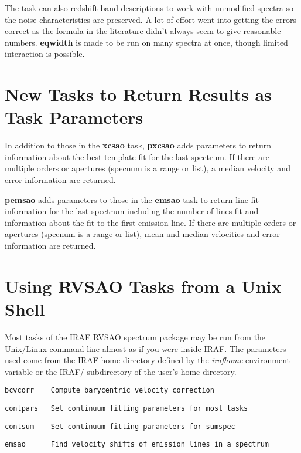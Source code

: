 The task can also redshift band descriptions to work with unmodified spectra so the noise characteristics are preserved.  A lot of effort went into getting the errors correct as the formula in the literature didn't always seem to give reasonable numbers.  \textbf{eqwidth} is made to be run on many spectra at once, though limited interaction is possible.

\section{New Tasks to Return Results as Task Parameters}

In addition to those in the \textbf{xcsao} task, \textbf{pxcsao} adds parameters to return information about the best template fit for the last spectrum.  If there are multiple orders or apertures (specnum is a  range or list), a median velocity and error information are returned.

\textbf{pemsao} adds parameters to those in the \textbf{emsao} task to return line fit information for the last spectrum including the number of lines fit and information about the fit to the first emission line.  If there are multiple orders or apertures (specnum is a range or list), mean and median velocities and error information are returned.

\section{Using RVSAO Tasks from a Unix Shell}

Most tasks of the IRAF RVSAO spectrum package may be run from the Unix/Linux command line almost as if you were inside IRAF. The parameters used come from the IRAF home directory defined by the \textit{irafhome} environment variable or the IRAF/ subdirectory of the user's home directory.

\texttt{bcvcorr~~~~Compute barycentric velocity correction}

\texttt{contpars~~~Set continuum fitting parameters for most tasks}

\texttt{contsum~~~~Set continuum fitting parameters for sumspec}

\texttt{emsao~~~~~~Find velocity shifts of emission lines in a spectrum}


